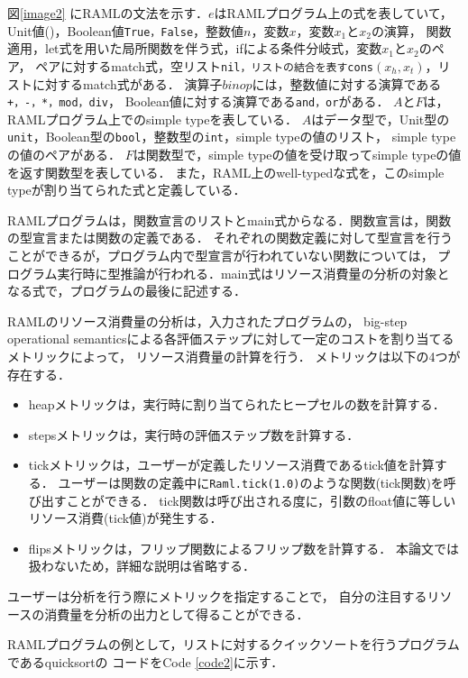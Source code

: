 \documentclass{kuisthesis}
\begin{document}
図\ref{image2} にRAMLの文法を示す．$e$はRAMLプログラム上の式を表していて，
Unit値()，Boolean値{\tt True，False}，整数値$n$，変数$x$，変数$x_1$と$x_2$の演算，
関数適用，let式を用いた局所関数を伴う式，ifによる条件分岐式，変数$x_1$と$x_2$のペア，
ペアに対するmatch式，空リスト{\tt nil，リストの結合を表すcons}$(x_h,x_t)$，リストに対するmatch式がある．
演算子$binop$には，整数値に対する演算である{\tt +，-，*，mod，div}，
Boolean値に対する演算である{\tt and，or}がある．
$A$と$F$は，RAMLプログラム上でのsimple typeを表している．
$A$はデータ型で，Unit型の{\tt unit}，Boolean型の{\tt bool}，整数型の{\tt int}，simple typeの値のリスト，
simple typeの値のペアがある．
$F$は関数型で，simple typeの値を受け取ってsimple typeの値を返す関数型を表している．
また，RAML上のwell-typedな式を，このsimple typeが割り当てられた式と定義している．

RAMLプログラムは，関数宣言のリストとmain式からなる．関数宣言は，関数の型宣言または関数の定義である．
それぞれの関数定義に対して型宣言を行うことができるが，プログラム内で型宣言が行われていない関数については，
プログラム実行時に型推論が行われる．main式はリソース消費量の分析の対象となる式で，プログラムの最後に記述する．


RAMLのリソース消費量の分析は，入力されたプログラムの，
big-step operational semanticsによる各評価ステップに対して一定のコストを割り当てるメトリックによって\cite{raml}，
リソース消費量の計算を行う．
メトリックは以下の4つが存在する．
\begin{itemize}
  \item heapメトリックは，実行時に割り当てられたヒープセルの数を計算する．
  \item stepsメトリックは，実行時の評価ステップ数を計算する．
  \item tickメトリックは，ユーザーが定義したリソース消費であるtick値を計算する．
  ユーザーは関数の定義中に{\tt Raml.tick(1.0)}のような関数(tick関数)を呼び出すことができる．
  tick関数は呼び出される度に，引数のfloat値に等しいリソース消費(tick値)が発生する．
  \item flipsメトリックは，フリップ関数によるフリップ数を計算する．
  本論文では扱わないため，詳細な説明は省略する．
\end{itemize}

ユーザーは分析を行う際にメトリックを指定することで，
自分の注目するリソースの消費量を分析の出力として得ることができる．

RAMLプログラムの例として，リストに対するクイックソートを行うプログラムであるquicksortの
コードをCode \ref{code2}に示す．
\end{document}
